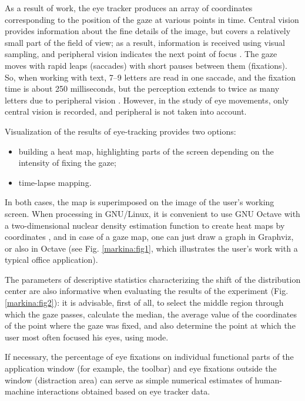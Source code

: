 \documentclass[10pt, a5paper]{article}
\begin{document}
As a result of work, the eye tracker produces an array of coordinates corresponding to the position of the gaze at various points in time. Central vision provides information about the fine details of the image, but covers a relatively small part of the field of view; as a result, information is received using visual sampling, and peripheral vision indicates the next point of focus \cite{bib5}. The gaze moves with rapid leaps (saccades) with short pauses between them (fixations). So, when working with text, 7–9 letters are read in one saccade, and the fixation time is about 250 milliseconds, but the perception extends to twice as many letters due to peripheral vision \cite{bib7}. However, in the study of eye \linebreak movements, only central vision is recorded, and peripheral is not taken into account.

Visualization of the results of eye-tracking provides two options:

\begin{itemize}
  \item building a heat map, highlighting parts of the screen depending on the intensity of fixing the gaze;
  \item time-lapse mapping.
\end{itemize}

In both cases, the map is superimposed on the image of the user's working screen. When processing in GNU/Linux, it is convenient to use GNU Octave with a two-dimensional nuclear density estimation function to create heat maps by coordinates \cite{bib8}, and in case of a gaze map, one can just draw a graph in Graphviz, or also in Octave (see Fig. \ref{markina:fig1}, which illustrates the user’s work with a typical office application).

The parameters of descriptive statistics characterizing the shift of the distribution center are also informative when evaluating the results of the experiment (Fig. \ref{markina:fig2}): it is advisable, first of all, to select the middle region through which the gaze passes, calculate the median, the average value of the coordinates of the point where the gaze was fixed, and also determine the point at which the user most often focused his eyes, using mode.

If necessary, the percentage of eye fixations on individual functional parts of the application window (for example, the toolbar) and eye fixations outside the window (distraction area) can serve as simple numerical estimates of human-machine interactions obtained based on eye tracker data.
\end{document}
